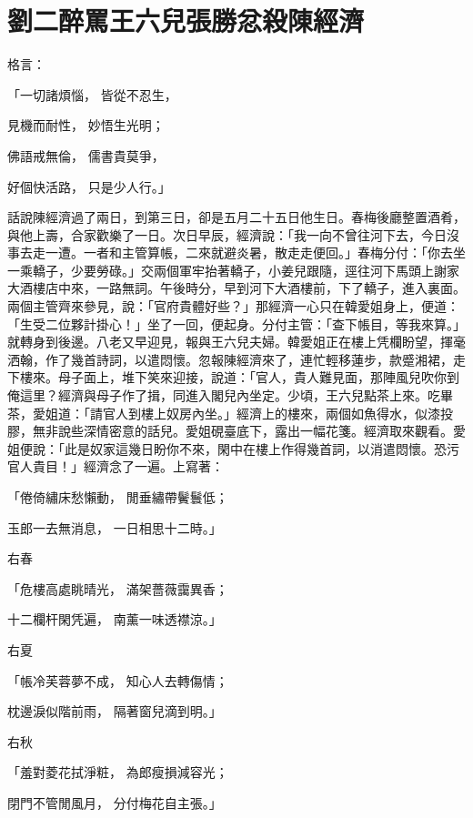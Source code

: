 %

\chapter{劉二醉罵王六兒\KG 張勝忿殺陳經濟}

格言：

「一切諸煩惱，  皆從不忍生，

見機而耐性，  妙悟生光明；

佛語戒無倫，  儒書貴莫爭，

好個快活路，  只是少人行。」

話說陳經濟過了兩日，到第三日，卻是五月二十五日他生日。春梅後廳整置酒肴，與他上壽，合家歡樂了一日。次日早辰，經濟說：「我一向不曾往河下去，今日沒事去走一遭。一者和主管算帳，二來就避炎暑，散走走便回。」春梅分付：「你去坐一乘轎子，少要勞碌。」交兩個軍牢抬著轎子，小姜兒跟隨，逕往河下馬頭上謝家大酒樓店中來，一路無詞。午後時分，早到河下大酒樓前，下了轎子，進入裏面。兩個主管齊來參見，說：「官府貴體好些？」那經濟一心只在韓愛姐身上，便道：「生受二位夥計掛心！」坐了一回，便起身。分付主管：「查下帳目，等我來算。」就轉身到後邊。八老又早迎見，報與王六兒夫婦。韓愛姐正在樓上凭欄盼望，揮毫洒翰，作了幾首詩詞，以遣悶懷。忽報陳經濟來了，連忙輕移蓮步，款蹙湘裙，走下樓來。母子面上，堆下笑來迎接，說道：「官人，貴人難見面，那陣風兒吹你到俺這里？經濟與母子作了揖，同進入閣兒內坐定。少頃，王六兒點茶上來。吃畢茶，愛姐道：「請官人到樓上奴房內坐。」經濟上的樓來，兩個如魚得水，似漆投膠，無非說些深情密意的話兒。愛姐硯臺底下，露出一幅花箋。經濟取來觀看。愛姐便說：「此是奴家這幾日盼你不來，閑中在樓上作得幾首詞，以消遣悶懷。恐污官人貴目！」經濟念了一遍。上寫著：

「倦倚繡床愁懶動，  閒垂繡帶鬢鬟低；

玉郎一去無消息，  一日相思十二時。」

右春

「危樓高處眺晴光，  滿架薔薇靄異香；

十二欄杆閑凭遍，  南薰一味透襟涼。」

右夏

「帳冷芙蓉夢不成，  知心人去轉傷情；

枕邊淚似階前雨，  隔著窗兒滴到明。」

右秋

「羞對菱花拭淨粧，  為郎瘦損減容光；

閉門不管閒風月，  分付梅花自主張。」

